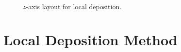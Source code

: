 
\begin{figure}[!ht]
\centering
  
  \caption{$z$-axis layout for local deposition.}
  \label{fig:zaxislo}
\end{figure}

\section{Local Deposition Method}



%  


%





